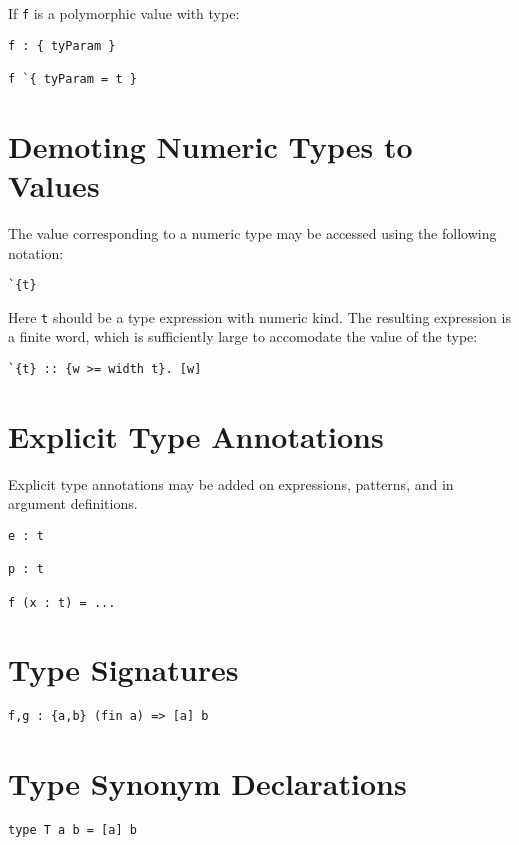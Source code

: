 If \texttt{f} is a polymorphic value with type:

\begin{verbatim}
f : { tyParam }

f `{ tyParam = t }
\end{verbatim}

\section{Demoting Numeric Types to
Values}\label{demoting-numeric-types-to-values}

The value corresponding to a numeric type may be accessed using the
following notation:

\begin{verbatim}
`{t}
\end{verbatim}

Here \texttt{t} should be a type expression with numeric kind. The
resulting expression is a finite word, which is sufficiently large to
accomodate the value of the type:

\begin{verbatim}
`{t} :: {w >= width t}. [w]
\end{verbatim}

\section{Explicit Type Annotations}\label{explicit-type-annotations}

Explicit type annotations may be added on expressions, patterns, and in
argument definitions.

\begin{verbatim}
e : t

p : t

f (x : t) = ...
\end{verbatim}

\section{Type Signatures}\label{type-signatures}

\begin{verbatim}
f,g : {a,b} (fin a) => [a] b
\end{verbatim}

\section{Type Synonym Declarations}\label{type-synonym-declarations}

\begin{verbatim}
type T a b = [a] b
\end{verbatim}
